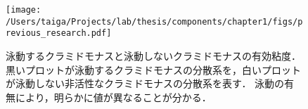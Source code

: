 \documentclass[11pt, a4j, dvipdfmx]{jarticle}
\begin{document}
    \begin{figure}[H]
        \centering
        \texttt{[image: /Users/taiga/Projects/lab/thesis/components/chapter1/figs/previous\_research.pdf]}
        \caption{泳動するクラミドモナスと泳動しないクラミドモナスの有効粘度\cite{effective_viscosity}．
        黒いプロットが泳動するクラミドモナスの分散系を，白いプロットが泳動しない非活性なクラミドモナスの分散系を表す．
        泳動の有無により，明らかに値が異なることが分かる．}
    \end{figure}
\end{document}
